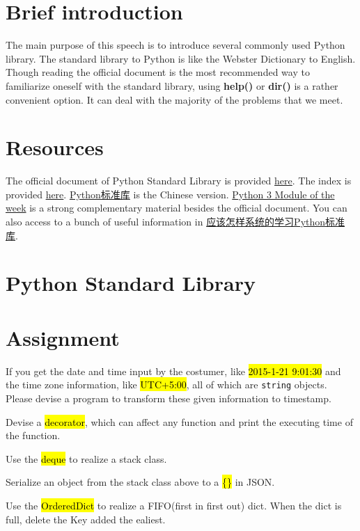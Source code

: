 \documentclass[english]{pkupaper}
\title{\titlemark}
\author{Yifei Wang}
\date{\today}
\begin{document}
\raggedright

\maketitle
\tableofcontents
\section{Brief introduction}
The main purpose of this speech is to introduce several commonly used Python library. The standard library to Python is like the Webster Dictionary to English. Though reading the official document is the most recommended way to familiarize oneself with the standard library, using \textbf{help()} or \textbf{dir()} is a rather convenient option. It can deal with the majority of the problems that we meet. 

\section{Resources}
The official document of Python Standard Library is provided \href{https://docs.python.org/3.6/library/index.html}{here}. The index is provided \href{https://docs.python.org/3.6/py-modindex.html}{here}.  \href{http://python.usyiyi.cn/translate/python_352/library/index.html}{Python标准库} is the Chinese version. \href{https://pymotw.com/3/index.html}{Python 3 Module of the week} is a strong complementary material besides the official document. You can also access to a bunch of useful information in \href{https://www.zhihu.com/question/22100190}{应该怎样系统的学习Python标准库}.

\section{Python Standard Library}






\section{Assignment}
\begin{thmque}[Required]
If you get the date and time input by the costumer, like \hl{2015-1-21 9:01:30} and the time zone information, like \hl{UTC+5:00}, all of which are \texttt{string} objects. Please devise a program to transform these given information to timestamp.
\end{thmque}
\begin{thmque}
Devise a \hl{decorator}, which can affect any function and print the executing time of the function.
\end{thmque}
\begin{thmque}[Required]
Use the \hl{deque} to realize a stack class.
\end{thmque}
\begin{thmque}
Serialize an object from the stack class above to a \hl{\{\}} in JSON.
\end{thmque}
\begin{thmque}[Required]
Use the \hl{OrderedDict} to realize a FIFO(first in first out) dict. When the dict is full, delete the Key added the ealiest.
\end{thmque}
\end{document}
